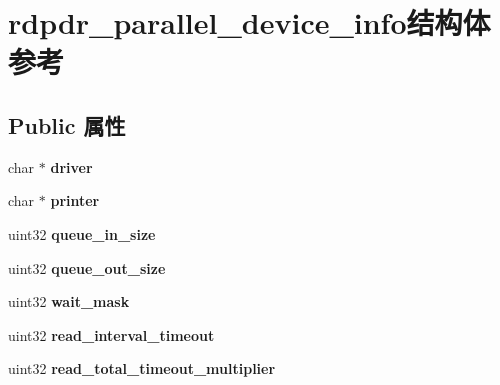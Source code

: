 \hypertarget{structrdpdr__parallel__device__info}{}\section{rdpdr\+\_\+parallel\+\_\+device\+\_\+info结构体 参考}
\label{structrdpdr__parallel__device__info}
\subsection*{Public 属性}
\begin{DoxyCompactItemize}
\item 
\mbox{\label{structrdpdr__parallel__device__info_a0436b975812acd27ddf22fc7d15c74c1}} 
char $\ast$ {\bfseries driver}
\item 
\mbox{\label{structrdpdr__parallel__device__info_a23a4ec8d1046a6d8317f5ee29dfea231}} 
char $\ast$ {\bfseries printer}
\item 
\mbox{\label{structrdpdr__parallel__device__info_aacdd5eea416ff358c3a549d326607e9c}} 
uint32 {\bfseries queue\+\_\+in\+\_\+size}
\item 
\mbox{\label{structrdpdr__parallel__device__info_ab89336a26841af0535d5aab8a98b5ac3}} 
uint32 {\bfseries queue\+\_\+out\+\_\+size}
\item 
\mbox{\label{structrdpdr__parallel__device__info_adfdc1864140b9e7e682303731c97f181}} 
uint32 {\bfseries wait\+\_\+mask}
\item 
\mbox{\label{structrdpdr__parallel__device__info_acc1c3004f4a1715493697d1a0cf223e8}} 
uint32 {\bfseries read\+\_\+interval\+\_\+timeout}
\item 
\mbox{\label{structrdpdr__parallel__device__info_a4de94d17eaf581dac81831830c87f402}} 
uint32 {\bfseries read\+\_\+total\+\_\+timeout\+\_\+multiplier}
\item 
\mbox{\label{structrdpdr__parallel__device__info_a335973b98d89d5b2675992a82a52ec64}} 

\end{DoxyCompactItemize}
